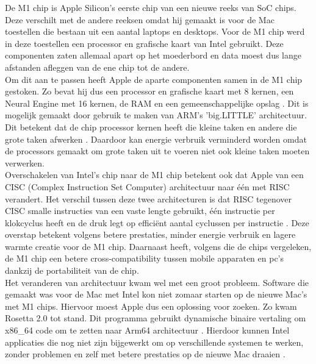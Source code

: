 \documentclass{hogent-article}
\begin{document}


De M1 chip is Apple Silicon's eerste chip van een nieuwe reeks van SoC chips. Deze verschilt met de andere reeksen omdat hij gemaakt is voor de Mac toestellen die bestaan uit een aantal laptops en desktops. Voor de M1 chip werd in deze toestellen een processor en grafische kaart van Intel gebruikt. Deze componenten zaten allemaal apart op het moederbord en data moest dus lange afstanden afleggen van de ene chip tot de andere. \\
Om dit aan te passen heeft Apple de aparte componenten samen in de M1 chip gestoken. Zo bevat hij dus een processor en grafische kaart met 8 kernen, een Neural Engine met 16 kernen, de RAM en een gemeenschappelijke opslag \autocite{Apple2020}. Dit is mogelijk gemaakt door gebruik te maken van ARM's 'big.LITTLE' architectuur. Dit betekent dat de chip processor kernen heeft die kleine taken en andere die grote taken afwerken \autocite{ARM2014}. Daardoor kan energie verbruik verminderd worden omdat de processors gemaakt om grote taken uit te voeren niet ook kleine taken moeten verwerken. \\
Overschakelen van Intel's chip naar de M1 chip betekent ook dat Apple van een CISC (Complex Instruction Set Computer) architectuur naar één met RISC verandert. Het verschil tussen deze twee architecturen is dat RISC tegenover CISC smalle instructies van een vaste lengte gebruikt, één instructie per klokcyclus heeft en de druk legt op efficiënt aantal cyclussen per instructie \autocite{Thornton2018}. Deze overstap betekent volgens \textcite{Frazelle2021} betere prestaties, minder energie verbruik en lagere warmte creatie voor de M1 chip. Daarnaast heeft, volgens \textcite{Dalakoti2022} die de chips vergeleken, de M1 chip een betere cross-compatibility tussen mobile apparaten en pc's dankzij de portabiliteit van de chip. \\
Het veranderen van architectuur kwam wel met een groot probleem. Software die gemaakt was voor de Mac met Intel kon niet zomaar starten op de nieuwe Mac's met M1 chips. Hiervoor moest Apple dus een oplossing voor zoeken. Zo kwam Rosetta 2.0 tot stand. Dit programma gebruikt dynamische binaire vertaling om x86\_64 code om te zetten naar Arm64 architectuur \autocite{Edwards2022}. Hierdoor kunnen Intel applicaties die nog niet zijn bijgewerkt om op verschillende systemen te werken, zonder problemen en zelf met betere prestaties op de nieuwe Mac draaien \autocite{Apple2020a}. \\
\end{document}
